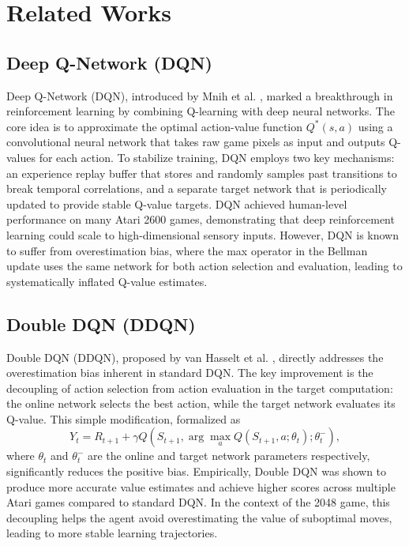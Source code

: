 \documentclass[conference]{IEEEtran}
\begin{document}
\section{Related Works}

\subsection{Deep Q-Network (DQN)}

Deep Q-Network (DQN), introduced by Mnih et al. \cite{mnih2013playing}, marked a breakthrough in reinforcement learning by combining Q-learning with deep neural networks. The core idea is to approximate the optimal action-value function $Q^*(s, a)$ using a convolutional neural network that takes raw game pixels as input and outputs Q-values for each action. To stabilize training, DQN employs two key mechanisms: an experience replay buffer that stores and randomly samples past transitions to break temporal correlations, and a separate target network that is periodically updated to provide stable Q-value targets. DQN achieved human-level performance on many Atari 2600 games, demonstrating that deep reinforcement learning could scale to high-dimensional sensory inputs. However, DQN is known to suffer from overestimation bias, where the max operator in the Bellman update uses the same network for both action selection and evaluation, leading to systematically inflated Q-value estimates.

\subsection{Double DQN (DDQN)}

Double DQN (DDQN), proposed by van Hasselt et al. \cite{vanhasselt2016deep}, directly addresses the overestimation bias inherent in standard DQN. The key improvement is the decoupling of action selection from action evaluation in the target computation: the online network selects the best action, while the target network evaluates its Q-value. This simple modification, formalized as
\begin{equation}\label{eq:ddqn}
Y_t = R_{t+1} + \gamma Q(S_{t+1}, \arg\max_a Q(S_{t+1}, a; \theta_t); \theta_t^-),
\end{equation}
where $\theta_t$ and $\theta_t^-$ are the online and target network parameters respectively, significantly reduces the positive bias. Empirically, Double DQN was shown to produce more accurate value estimates and achieve higher scores across multiple Atari games compared to standard DQN. In the context of the 2048 game, this decoupling helps the agent avoid overestimating the value of suboptimal moves, leading to more stable learning trajectories.
\end{document}
